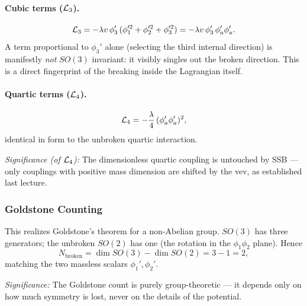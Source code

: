 \paragraph{Cubic terms ($\mathcal{L}_3$).}
\begin{equation}
  \mathcal{L}_3=-\lambda v\,\phi_3'\,(\phi_1'^2+\phi_2'^2+\phi_3'^2)
  =-\lambda v\,\phi_3'\,\phi_a'\phi_a' .
  \label{eq:lec16:so3_cubic}
\end{equation}
A term proportional to $\phi_3'$ alone (selecting the third internal direction) is manifestly \emph{not} $SO(3)$ invariant: it visibly singles out the broken direction. This is a direct fingerprint of the breaking inside the Lagrangian itself.

\paragraph{Quartic terms ($\mathcal{L}_4$).}
\begin{equation}
  \mathcal{L}_4=-\frac{\lambda}{4}\,(\phi_a'\phi_a')^2 ,
  \label{eq:lec16:so3_quartic}
\end{equation}
identical in form to the unbroken quartic interaction.

\textit{Significance (of $\mathcal{L}_4$):} The dimensionless quartic coupling is untouched by SSB --- only couplings with positive mass dimension are shifted by the vev, as established last lecture.

\subsubsection*{Goldstone Counting}

This realizes Goldstone's theorem for a non-Abelian group. $SO(3)$ has three generators; the unbroken $SO(2)$ has one (the rotation in the $\phi_1\phi_2$ plane). Hence
\begin{equation}
  N_{\text{broken}}=\dim SO(3)-\dim SO(2)=3-1=2,
  \label{eq:lec16:so3_broken_count}
\end{equation}
matching the two massless scalars $\phi_1',\phi_2'$.


\textit{Significance:} The Goldstone count is purely group-theoretic --- it depends only on how much symmetry is lost, never on the details of the potential.

